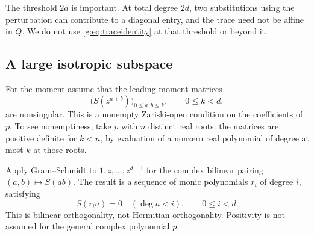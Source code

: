 \documentclass[UTF8,11pt]{ctexart}
\theoremstyle{definition}
\numberwithin{equation}{section}
\begin{document}
The threshold $2d$ is important. At total degree $2d$, two substitutions
using the perturbation can contribute to a diagonal entry, and the trace
need not be affine in $Q$. We do not use \eqref{g:eq:traceidentity} at that
threshold or beyond it.

\subsection{A large isotropic subspace}
For the moment assume that the leading moment matrices
\begin{equation}\label{g:eq:momentcondition}
 \bigl(S(z^{a+b})\bigr)_{0\le a,b\le k},\qquad 0\le k<d,
\end{equation}
are nonsingular. This is a nonempty Zariski-open condition on the
coefficients of $p$. To see nonemptiness, take $p$ with $n$ distinct real
roots: the matrices are positive definite for $k<n$, by evaluation of a
nonzero real polynomial of degree at most $k$ at those roots.

Apply Gram--Schmidt to $1,z,\ldots,z^{d-1}$ for the complex bilinear pairing
$(a,b)\mapsto S(ab)$. The result is a sequence of monic polynomials
$r_i$ of degree $i$, satisfying
\begin{equation}\label{g:eq:orthogonality}
 S(r_i a)=0\quad(\deg a<i),\qquad 0\le i<d.
\end{equation}
This is bilinear orthogonality, not Hermitian orthogonality. Positivity is
not assumed for the general complex polynomial $p$.
\end{document}
